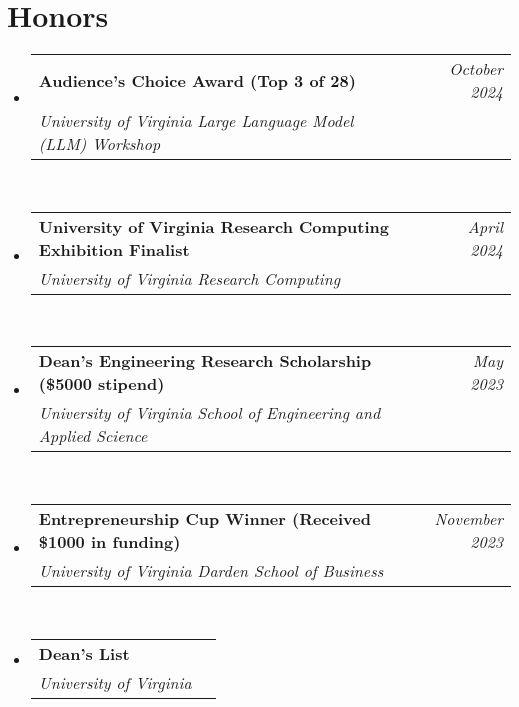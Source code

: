 \documentclass[letterpaper,11pt]{article}
\makeatletter
\newcommand{\Date}[1]{\textit{\small #1}}
\newcommand{\resumeSubheading}[4]{
  \item
    \begin{tabular*}{0.9798\textwidth}{l@{\extracolsep{\fill}}r} %
      \textbf{#1} & #2 \\
      \textit{\small#3} & \Date{#4} \\
    \end{tabular*}\
}
\makeatother
\begin{document}
\section{Honors}
\begin{itemize}
  \resumeSubheading{Audience's Choice Award \textnormal{(Top 3 of 28)}}{\Date{October 2024}}{University of Virginia Large Language Model (LLM) Workshop}{} \\
  \resumeSubheading{University of Virginia Research Computing Exhibition Finalist}{\Date{April 2024}}{University of Virginia Research Computing}{} \\
  \resumeSubheading{Dean's Engineering Research Scholarship \textnormal{(\$5000 stipend)}}{\Date{May 2023}}{University of Virginia School of Engineering and Applied Science}{} \\
  \resumeSubheading{Entrepreneurship Cup Winner \textnormal{(Received \$1000 in funding)}}{\Date{November 2023}}{University of Virginia Darden School of Business}{} \\
  \resumeSubheading{Dean's List}{}{University of Virginia}{}
\end{itemize}
\end{document}

